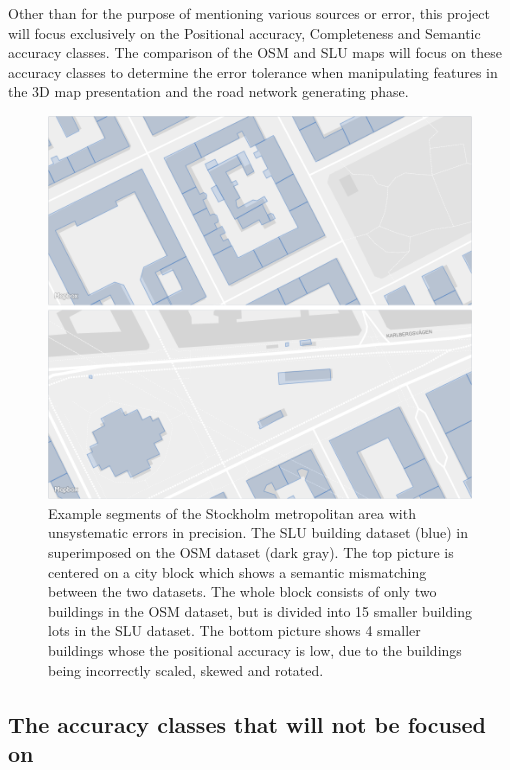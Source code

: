 \documentclass[a4paper]{article}
\begin{document}
Other than for the purpose of mentioning various sources or error, this project will focus exclusively on the Positional accuracy, Completeness and Semantic accuracy classes. The comparison of the OSM and SLU maps will focus on these accuracy classes to determine the error tolerance when manipulating features in the 3D map presentation and the road network generating phase.

\begin{figure}[H]
    \centering
    \includegraphics[width=\textwidth,height=0.5\textheight,keepaspectratio]{img_map_compare}
    \caption{Example segments of the Stockholm metropolitan area with unsystematic errors in precision. The SLU building dataset (blue) in superimposed on the OSM dataset (dark gray). The top picture is centered on a city block which shows a semantic mismatching between the two datasets. The whole block consists of only two buildings in the OSM dataset, but is divided into 15 smaller building lots in the SLU dataset. The bottom picture shows 4 smaller buildings whose the positional accuracy is low, due to the buildings being incorrectly scaled, skewed and rotated.}
    \label{fig:space}
\end{figure}

\subsection{The accuracy classes that will not be focused on}
\end{document}
